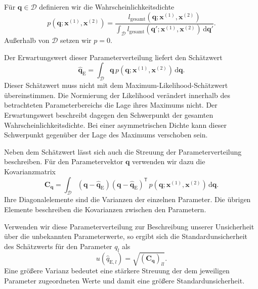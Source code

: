 Für $\mathbf q\in\mathcal D$ definieren wir die
Wahrscheinlichkeitsdichte
\begin{equation}
p(\mathbf q;\mathbf x^{(1)},\mathbf x^{(2)})
=
\frac{
l_{\mathrm{gesamt}}(\mathbf q;\mathbf x^{(1)},\mathbf x^{(2)})
}{
\displaystyle\int_{\mathcal D}
l_{\mathrm{gesamt}}(\mathbf q';\mathbf x^{(1)},\mathbf x^{(2)})
\,\mathrm d\mathbf q'
}.
\label{eq:normiertelikelihoodgesamt}
\end{equation}
Außerhalb von $\mathcal D$ setzen wir $p=0$.

Der Erwartungswert dieser Parameterverteilung liefert
den Schätzwert
\begin{equation}
\widehat{\mathbf q}_{\mathrm E}
=
\int_{\mathcal D}
\mathbf q\,p(\mathbf q;\mathbf x^{(1)},\mathbf x^{(2)})
\,\mathrm d\mathbf q.
\label{eq:erwartungswertauslikelihoods}
\end{equation}
Dieser Schätzwert muss nicht mit dem
Maximum-Likelihood-Schätzwert übereinstimmen.
Die Normierung der Likelihood verändert innerhalb des
betrachteten Parameterbereichs die Lage ihres Maximums nicht.
Der Erwartungswert beschreibt dagegen den Schwerpunkt
der gesamten Wahrscheinlichkeitsdichte.
Bei einer asymmetrischen Dichte kann dieser Schwerpunkt
gegenüber der Lage des Maximums verschoben sein.

Neben dem Schätzwert lässt sich auch die Streuung der
Parameterverteilung beschreiben. Für den Parametervektor
$\mathbf q$ verwenden wir dazu die Kovarianzmatrix
\begin{equation}
\mathbf C_{\mathbf q}
=
\int_{\mathcal D}
(\mathbf q-\widehat{\mathbf q}_{\mathrm E})
(\mathbf q-\widehat{\mathbf q}_{\mathrm E})^{\mathsf T}
\,p(\mathbf q;\mathbf x^{(1)},\mathbf x^{(2)})
\,\mathrm d\mathbf q.
\label{eq:kovarianzauslikelihoods}
\end{equation}
Ihre Diagonalelemente sind die Varianzen der einzelnen
Parameter. Die übrigen Elemente beschreiben die
Kovarianzen zwischen den Parametern.

Verwenden wir diese Parameterverteilung zur Beschreibung
unserer Unsicherheit über die unbekannten Parameterwerte,
so ergibt sich die Standardunsicherheit des Schätzwerts
für den Parameter $q_l$ als
\begin{equation}
u(\widehat q_{\mathrm E,l})
=
\sqrt{(\mathbf C_{\mathbf q})_{ll}}.
\label{eq:standardunsicherheitausparameterdichte}
\end{equation}
Eine größere Varianz bedeutet eine stärkere Streuung
der dem jeweiligen Parameter zugeordneten Werte und
damit eine größere Standardunsicherheit.

